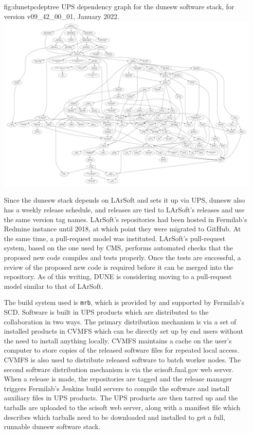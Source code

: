 \documentclass[../main-v1.tex]{subfiles}
\begin{document}
\begin{dunefigure}
{fig:dunetpcdeptree}
{UPS dependency graph for the dunesw software stack, for version v09\_42\_00\_01, January 2022.}
\includegraphics[width=\textwidth]{graphics/CodeManagementFigures/dunesw_v09_42_00_01_graph.pdf}
\end{dunefigure}

Since the dunesw stack depends on LArSoft and sets it up via UPS, dunesw also has a weekly release schedule, and releases are tied to LArSoft's releases and use the same version tag names.  LArSoft's repositories had been hosted in Fermilab's Redmine instance until 2018, at which point they were migrated to GitHub.  At the same time, a pull-request model was instituted.  LArSoft's pull-request system, based on the one used by CMS, performs automated checks that the proposed new code compiles and tests properly.  Once the tests are successful, a review of the proposed new code is required before it can be merged into the repository.  As of this writing, DUNE is considering moving to a pull-request model similar to that of LArSoft.

The build system used is {\tt mrb}, which is provided by and supported by Fermilab's SCD.  Software is built in UPS products which are distributed to the collaboration in two ways.  The primary distribution mechanism is via a set of installed products in CVMFS which can be directly set up by end users without the need to install anything locally.  CVMFS maintains a cache on the user's computer to store copies of the released software files for repeated local access.  CVMFS is also used to distribute released software to batch worker nodes.  The second software distribution mechanism is via the scisoft.fnal.gov web server.  When a release is made, the repositories are tagged and the release manager triggers Fermilab's Jenkins build servers to compile the software and install auxiliary files in UPS products.  The UPS products are then tarred up and the tarballs are uploaded to the scisoft web server, along with a manifest file which describes which tarballs need to be downloaded and installed to get a full, runnable dunesw software stack.
\end{document}
